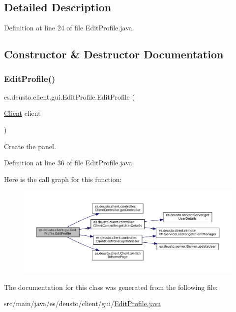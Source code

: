 \subsection{Detailed Description}


Definition at line 24 of file Edit\+Profile.\+java.



\subsection{Constructor \& Destructor Documentation}
\mbox{\label{classes_1_1deusto_1_1client_1_1gui_1_1_edit_profile_a0302d5f1a2df66b4e4ce357ec32015bd}} 
\subsubsection{\texorpdfstring{EditProfile()}{EditProfile()}}
{\footnotesize\ttfamily es.\+deusto.\+client.\+gui.\+Edit\+Profile.\+Edit\+Profile (\begin{DoxyParamCaption}\item[{\mbox{\hyperlink{classes_1_1deusto_1_1client_1_1_client}{Client}}}]{client }\end{DoxyParamCaption})}

Create the panel. 

Definition at line 36 of file Edit\+Profile.\+java.

Here is the call graph for this function\+:\nopagebreak
\begin{figure}[H]
\begin{center}
\leavevmode
\includegraphics[width=350pt]{classes_1_1deusto_1_1client_1_1gui_1_1_edit_profile_a0302d5f1a2df66b4e4ce357ec32015bd_cgraph}
\end{center}
\end{figure}


The documentation for this class was generated from the following file\+:\begin{DoxyCompactItemize}
\item 
src/main/java/es/deusto/client/gui/\mbox{\hyperlink{_edit_profile_8java}{Edit\+Profile.\+java}}\end{DoxyCompactItemize}
